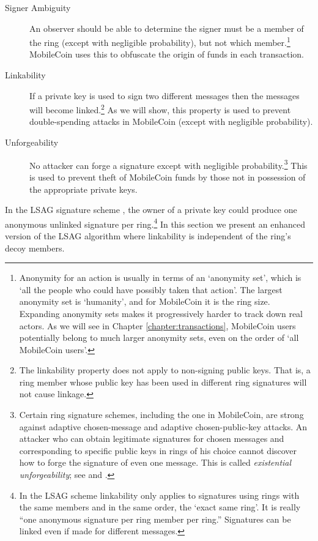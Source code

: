 \begin{description}
	\item[Signer Ambiguity]
	An observer should be able to determine the signer must be a member of the ring (except with negligible probability), but not which member.\footnote{\label{anonymity_note}Anonymity for an action is usually in terms of an `anonymity set’, which is `all the people who could have possibly taken that action’. The largest anonymity set is `humanity’, and for MobileCoin it is the ring size. Expanding anonymity sets makes it progressively harder to track down real actors. As we will see in Chapter \ref{chapter:transactions}, MobileCoin users potentially belong to much larger anonymity sets, even on the order of `all MobileCoin users'.} MobileCoin uses this to obfuscate the origin of funds in each transaction.

	\item[Linkability]
	If a private key is used to sign two different messages then the messages will become linked.\footnote{\label{linkability_note}The linkability property does not apply to non-signing public keys. That is, a ring member whose public key has been used in different ring signatures will not cause linkage.} As we will show, this property is used to prevent double-spending attacks in MobileCoin (except with negligible probability).

	\item[Unforgeability]
    No attacker can forge a signature except with negligible probability.\footnote{Certain ring signature schemes, including the one in MobileCoin, are strong against adaptive chosen-message and adaptive chosen-public-key attacks. An attacker who can obtain legitimate signatures for chosen messages and corresponding to specific public keys in rings of his choice cannot discover how to forge the signature of even one message. This is called {\em existential unforgeability}; see \cite{MRL-0005-ringct} and \cite{Liu2004}.} This is used to prevent theft of MobileCoin funds by those not in possession of the appropriate private keys.
\end{description}

In the LSAG signature scheme \cite{Liu2004}, the owner of a private key could produce one anonymous unlinked signature per ring.\footnote{\label{lsag_linkability_note}In the LSAG scheme linkability only applies to signatures using rings with the same members and in the same order, the `exact same ring'. It is really ``one anonymous signature per ring member per ring.” Signatures can be linked even if made for different messages.} In this section we present an enhanced version of the LSAG algorithm where linkability is independent of the ring’s decoy members.

